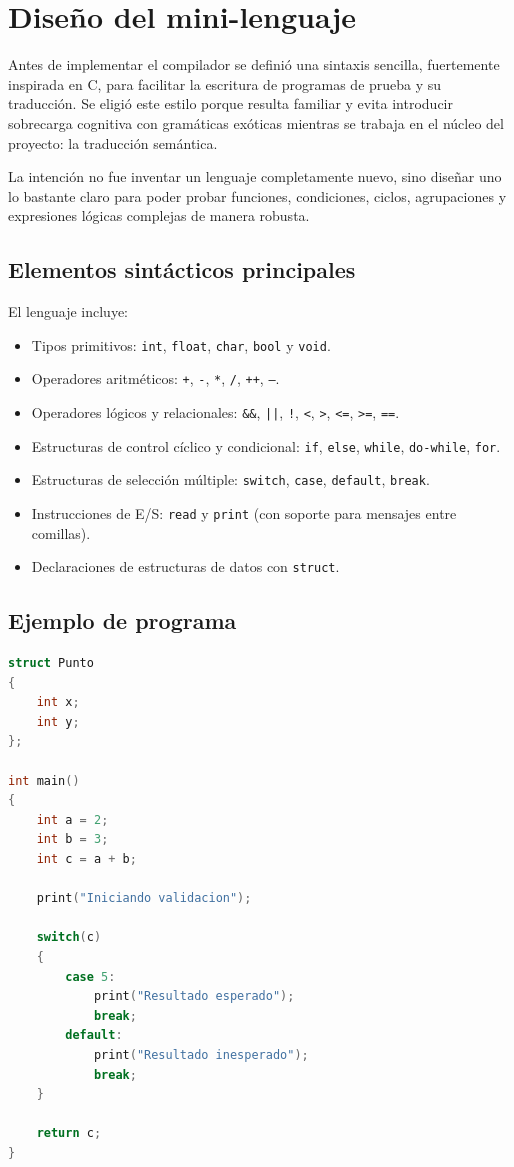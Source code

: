 \documentclass[12pt]{article}
\begin{document}
\section{Diseño del mini-lenguaje}
Antes de implementar el compilador se definió una sintaxis sencilla, fuertemente inspirada en C, para facilitar la escritura de programas de prueba y su traducción. Se eligió este estilo porque resulta familiar y evita introducir sobrecarga cognitiva con gramáticas exóticas mientras se trabaja en el núcleo del proyecto: la traducción semántica.

La intención no fue inventar un lenguaje completamente nuevo, sino diseñar uno lo bastante claro para poder probar funciones, condiciones, ciclos, agrupaciones y expresiones lógicas complejas de manera robusta.

\subsection{Elementos sintácticos principales}
El lenguaje incluye:
\begin{itemize}[label={-}]
    \item Tipos primitivos: \texttt{int}, \texttt{float}, \texttt{char}, \texttt{bool} y \texttt{void}.
    \item Operadores aritméticos: \texttt{+}, \texttt{-}, \texttt{*}, \texttt{/}, \texttt{++}, \texttt{--}.
    \item Operadores lógicos y relacionales: \texttt{\&\&}, \texttt{||}, \texttt{!}, \texttt{<}, \texttt{>}, \texttt{<=}, \texttt{>=}, \texttt{==}.
    \item Estructuras de control cíclico y condicional: \texttt{if}, \texttt{else}, \texttt{while}, \texttt{do-while}, \texttt{for}.
    \item Estructuras de selección múltiple: \texttt{switch}, \texttt{case}, \texttt{default}, \texttt{break}.
    \item Instrucciones de E/S: \texttt{read} y \texttt{print} (con soporte para mensajes entre comillas).
    \item Declaraciones de estructuras de datos con \texttt{struct}.
\end{itemize}

\subsection{Ejemplo de programa}
\begin{lstlisting}[language=C, caption={Ejemplo representativo del mini-lenguaje}]
struct Punto
{
    int x;
    int y;
};

int main()
{
    int a = 2;
    int b = 3;
    int c = a + b;

    print("Iniciando validacion");

    switch(c)
    {
        case 5:
            print("Resultado esperado");
            break;
        default:
            print("Resultado inesperado");
            break;
    }

    return c;
}
\end{lstlisting}
\end{document}
